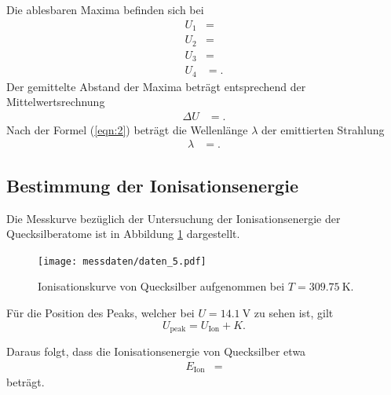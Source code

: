 Die ablesbaren Maxima befinden sich bei
\begin{align}
  U_1 &=  \\
  U_2 &=  \\
  U_3 &=  \\
  U_4 &= .
\end{align}
Der gemittelte Abstand der Maxima beträgt entsprechend der Mittelwertsrechnung
\begin{align}
  \Delta U &= .
\end{align}
Nach der Formel (\ref{eqn:2}) beträgt die Wellenlänge $\lambda$ der emittierten Strahlung
\begin{align}
  \lambda &= .
\end{align}

\subsection{Bestimmung der Ionisationsenergie}
Die Messkurve bezüglich der Untersuchung der Ionisationsenergie der Quecksilberatome ist in Abbildung \ref{fig:abb2} dargestellt.

\begin{figure}[H]
  \centering
  \texttt{[image: messdaten/daten\_5.pdf]}
  \caption{Ionisationskurve von Quecksilber aufgenommen bei $T = \SI{309.75}{\kelvin}$.}
  \label{fig:abb2}
\end{figure}

Für die Position des Peaks, welcher bei $U = \SI{14.1}{\volt}$ zu sehen ist, gilt
\begin{equation}
  U_{\text{peak}} = U_{\text{Ion}} + K.
\end{equation}

Daraus folgt, dass die Ionisationsenergie von Quecksilber etwa
\begin{align}
  E_{\text{Ion}} &= 
\end{align}
beträgt.

